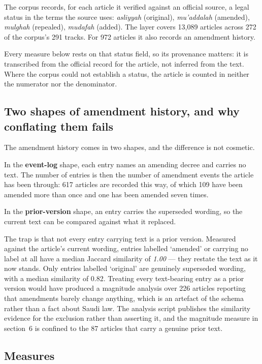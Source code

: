 \documentclass[11pt]{article}
\begin{document}
The corpus records, for each article it verified against an official source, a
legal status in the terms the source uses: \emph{asliyyah} (original),
\emph{mu'addalah} (amended), \emph{mulghah} (repealed), \emph{mudafah}
(added). The layer covers 13,089 articles across 272 of the corpus's 291
tracks. For 972 articles it also records an amendment history.

Every measure below rests on that status field, so its provenance matters: it
is transcribed from the official record for the article, not inferred from the
text. Where the corpus could not establish a status, the article is counted in
neither the numerator nor the denominator.

\subsection{Two shapes of amendment history, and why conflating them fails}

The amendment history comes in two shapes, and the difference is not
cosmetic.

In the \textbf{event-log} shape, each entry names an amending decree and
carries no text. The number of entries is then the number of amendment events
the article has been through: 617 articles are recorded this way, of which 109
have been amended more than once and one has been amended seven times.

In the \textbf{prior-version} shape, an entry carries the superseded wording,
so the current text can be compared against what it replaced.

The trap is that not every entry carrying text is a prior version. Measured
against the article's current wording, entries labelled `amended' or carrying
no label at all have a median Jaccard similarity of \emph{1.00} --- they
restate the text as it now stands. Only entries labelled `original' are
genuinely superseded wording, with a median similarity of 0.82. Treating every
text-bearing entry as a prior version would have produced a magnitude analysis
over 226 articles reporting that amendments barely change anything, which is
an artefact of the schema rather than a fact about Saudi law. The analysis
script publishes the similarity evidence for the exclusion rather than
asserting it, and the magnitude measure in section~6 is
confined to the 87 articles that carry a genuine prior text.

\subsection{Measures}
\end{document}
